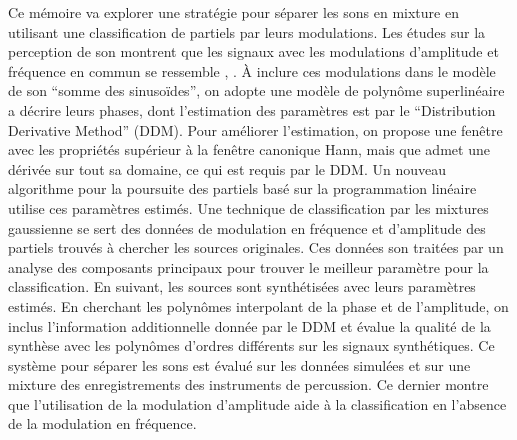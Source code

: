 Ce mémoire va explorer une stratégie pour séparer les sons en mixture en
utilisant une classification de partiels par leurs modulations. Les études sur
la perception de son montrent que les signaux avec les modulations d'amplitude
et fréquence en commun se ressemble \cite{mcadams1989segregation},
\cite{marin1991segregation}. À inclure ces modulations dans le modèle de son
``somme des sinusoïdes'', on adopte une modèle de polynôme superlinéaire a
décrire leurs phases, dont l'estimation des paramètres est par le ``Distribution
Derivative Method'' (DDM). Pour améliorer l'estimation, on propose une fenêtre
avec les propriétés supérieur à la fenêtre canonique Hann, mais que admet une
dérivée sur tout sa domaine, ce qui est requis par le DDM. Un nouveau algorithme
pour la poursuite des partiels basé sur la programmation linéaire utilise ces
paramètres estimés.  Une technique de classification par les mixtures gaussienne
se sert des données de modulation en fréquence et d'amplitude des partiels
trouvés à chercher les sources originales. Ces données son traitées par un
analyse des composants principaux pour trouver le meilleur paramètre pour la
classification. En suivant, les sources sont synthétisées avec leurs paramètres
estimés. En cherchant les polynômes interpolant de la phase et de l'amplitude,
on inclus l'information additionnelle donnée par le DDM et évalue la qualité de
la synthèse avec les polynômes d'ordres différents sur les signaux synthétiques.
Ce système pour séparer les sons est évalué sur les données simulées et sur une
mixture des enregistrements des instruments de percussion. Ce dernier montre que
l'utilisation de la modulation d'amplitude aide à la classification en l'absence
de la modulation en fréquence.
